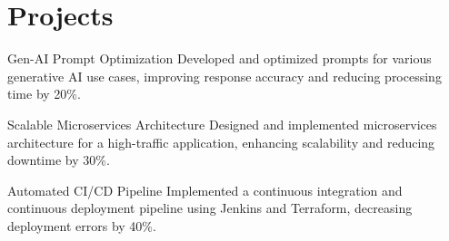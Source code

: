 \section{Projects}
\resumeSubHeadingListStart
  \resumeProjectHeading
      {Gen-AI Prompt Optimization}
      {Developed and optimized prompts for various generative AI use cases, improving response accuracy and reducing processing time by 20\%.}

  \resumeProjectHeading
      {Scalable Microservices Architecture}
      {Designed and implemented microservices architecture for a high-traffic application, enhancing scalability and reducing downtime by 30\%.}

  \resumeProjectHeading
      {Automated CI/CD Pipeline}
      {Implemented a continuous integration and continuous deployment pipeline using Jenkins and Terraform, decreasing deployment errors by 40\%.}

\resumeSubHeadingListEnd
